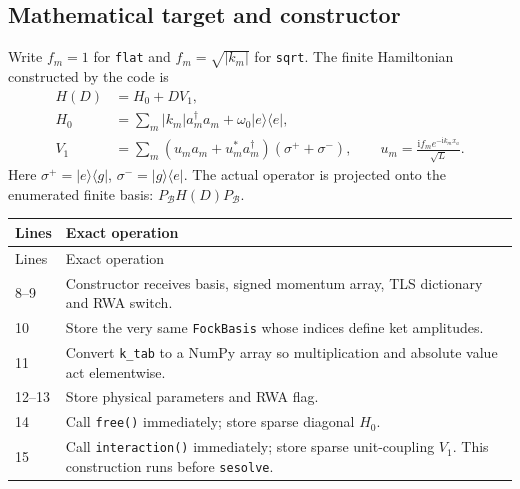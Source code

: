 \documentclass[11pt,a4paper]{article}
\newcommand{\ket}[1]{\lvert #1\rangle}
\newcommand{\bra}[1]{\langle #1\rvert}
\newcommand{\code}[1]{\nolinkurl{#1}}
\newcommand{\ii}{\mathrm i}
\begin{document}
\subsection{Mathematical target and constructor}
Write $f_m=1$ for \code{flat} and $f_m=\sqrt{|k_m|}$ for \code{sqrt}.
The finite Hamiltonian constructed by the code is
\begin{align}
H(D)&=H_0+D V_1,\label{eq:HD}\\
H_0&=\sum_m|k_m|a_m^\dagger a_m
       +\omega_0\ket e\bra e,\label{eq:H0}\\
V_1&=\sum_m\left(u_ma_m+u_m^*a_m^\dagger\right)
                  (\sigma^++\sigma^-),\qquad
u_m=\frac{\ii f_m e^{-\ii k_mx_a}}{\sqrt L}.
\label{eq:V}
\end{align}
Here $\sigma^+=\ket e\bra g$, $\sigma^-=\ket g\bra e$.
The actual operator is projected onto the enumerated finite basis:
$P_{\mathcal B}H(D)P_{\mathcal B}$.

\begin{longtable}{p{}p{}}
\toprule Lines & Exact operation\\\midrule\endfirsthead
\toprule Lines & Exact operation\\\midrule\endhead
8--9 & Constructor receives basis, signed momentum array, TLS dictionary and RWA switch.\\
10 & Store the very same \code{FockBasis} whose indices define ket amplitudes.\\
11 & Convert \code{k_tab} to a NumPy array so multiplication and absolute value act elementwise.\\
12--13 & Store physical parameters and RWA flag.\\
14 & Call \code{free()} immediately; store sparse diagonal $H_0$.\\
15 & Call \code{interaction()} immediately; store sparse unit-coupling $V_1$. This construction runs before \code{sesolve}.\\
\bottomrule
\end{longtable}
\end{document}
